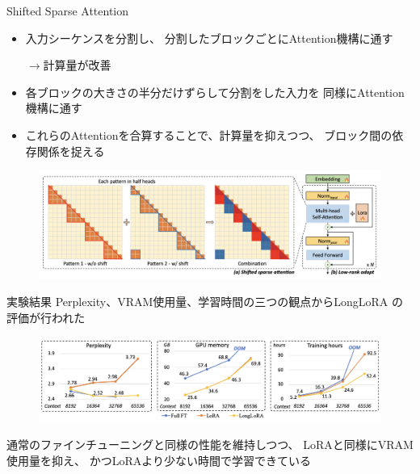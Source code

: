 \documentclass[dvipdfm, aspectratio=169]{beamer}
\begin{document}
    \begin{frame}{Shifted Sparse Attention}
        \begin{itemize}
            \item{
                入力シーケンスを分割し、
                分割したブロックごとにAttention機構に通す

                $\rightarrow$計算量が改善
            }
            \item{
                各ブロックの大きさの半分だけずらして分割をした入力を
                同様にAttention機構に通す
            }
            \item{
                これらのAttentionを合算することで、計算量を抑えつつ、
                ブロック間の依存関係を捉える
            }
        \end{itemize}
        \begin{figure}[ht]
            \centering
            \includegraphics[width=.9\hsize]{ssa.png}
        \end{figure}
    \end{frame}
    \begin{frame}{実験結果}
        Perplexity、VRAM使用量、学習時間の三つの観点からLongLoRA
        の評価が行われた
        \begin{figure}[ht]
            \centering
            \includegraphics[width=\hsize]{longlora.png}
        \end{figure}

        通常のファインチューニングと同様の性能を維持しつつ、
        LoRAと同様にVRAM使用量を抑え、
        かつLoRAより少ない時間で学習できている
    \end{frame}
\end{document}
